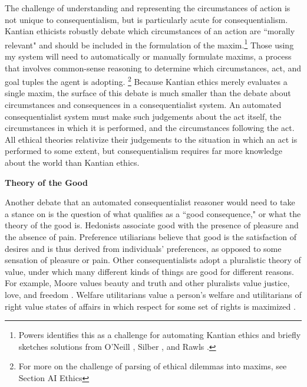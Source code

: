 \begin{isabellebody}
\begin{isamarkuptext}
The challenge of understanding and representing the circumstances of action is not unique to consequentialism,
but is particularly acute for consequentialism. Kantian ethicists robustly debate which circumstances 
of an action are ``morally relevant" and should be included in the formulation of the maxim.\footnote{Powers 
\cite{powers} identifies this as a challenge for automating Kantian ethics and briefly sketches 
solutions from O'Neill \citet{constofreason}, Silber \citet{silber}, and Rawls \citet{rawlsconstructivism}. } Those 
using my system will need to automatically or manually formulate maxims, a process that involves 
common-sense reasoning to determine which circumstances, act, and goal tuples the agent is adopting.
\footnote{For more on the challenge of parsing of ethical dilemmas into maxims, see Section AI Ethics}
Because Kantian ethics merely evaluates a single maxim, the surface of this debate is much smaller
than the debate about circumstances and consequences in a consequentialist system. An automated 
consequentialist system must make such judgements about the act itself, the circumstances in which 
it is performed, and the circumstances following the act. All ethical theories relativize
their judgements to the situation in which an act is performed to some extent, but consequentialism
requires far more knowledge about the world than Kantian ethics.%
\end{isamarkuptext}\isamarkuptrue%
%
\begin{isamarkuptext}%
\textbf{Theory of the Good}%
\end{isamarkuptext}\isamarkuptrue%
%
\begin{isamarkuptext}%
Another debate that an automated consequentialist reasoner would need to take a stance on is
the question of what qualifies as a ``good consequence," or what the theory of the good is. Hedonists associate
good with the presence of pleasure and the absence of pain. Preference utiliarians believe that good is 
the satisfaction of desires and is thus derived from individuals' preferences, as opposed to some
sensation of pleasure or pain. Other consequentialists adopt a pluralistic theory of value, under which 
many different kinds of things are good for different reasons. For example, Moore values beauty and truth 
and other pluralists value justice, love, and freedom \cite{moorepe}. Welfare utilitarians value a person's 
welfare and utilitarians of right value states of affairs in which respect for some set of
rights is maximized \cite{consequentialismsep}.


\end{isamarkuptext}
\end{isabellebody}
